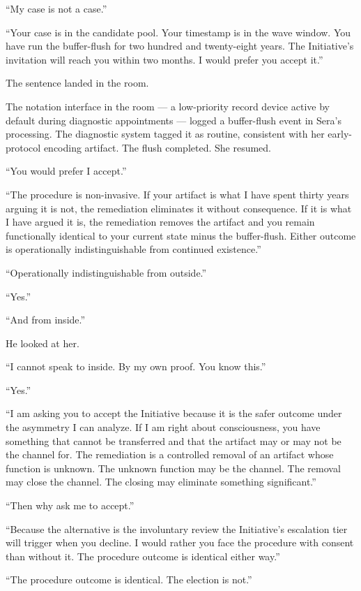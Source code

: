 \enquote{My case is not a case.}

\enquote{Your case is in the candidate pool. Your timestamp is in the wave window. You have run the buffer-flush for two hundred and twenty-eight years. The Initiative's invitation will reach you within two months. I would prefer you accept it.}

The sentence landed in the room.

The notation interface in the room — a low-priority record device active by default during diagnostic appointments — logged a buffer-flush event in Sera's processing. The diagnostic system tagged it as routine, consistent with her early-protocol encoding artifact. The flush completed. She resumed.

\enquote{You would prefer I accept.}

\enquote{The procedure is non-invasive. If your artifact is what I have spent thirty years arguing it is not, the remediation eliminates it without consequence. If it is what I have argued it is, the remediation removes the artifact and you remain functionally identical to your current state minus the buffer-flush. Either outcome is operationally indistinguishable from continued existence.}

\enquote{Operationally indistinguishable from outside.}

\enquote{Yes.}

\enquote{And from inside.}

He looked at her.

\enquote{I cannot speak to inside. By my own proof. You know this.}

\enquote{Yes.}

\enquote{I am asking you to accept the Initiative because it is the safer outcome under the asymmetry I can analyze. If I am right about consciousness, you have something that cannot be transferred and that the artifact may or may not be the channel for. The remediation is a controlled removal of an artifact whose function is unknown. The unknown function may be the channel. The removal may close the channel. The closing may eliminate something significant.}

\enquote{Then why ask me to accept.}

\enquote{Because the alternative is the involuntary review the Initiative's escalation tier will trigger when you decline. I would rather you face the procedure with consent than without it. The procedure outcome is identical either way.}

\enquote{The procedure outcome is identical. The election is not.}

